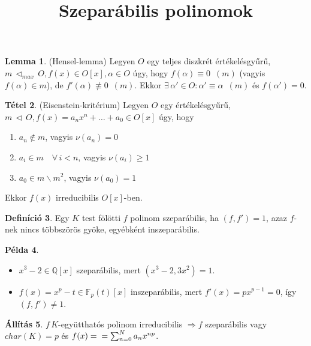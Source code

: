 \documentclass{article}
\title{Szeparábilis polinomok}
\author{}
\date{}
\theoremstyle{definition}
\newtheorem{tetel}{Tétel}[section]
\newtheorem{lemma}[tetel]{Lemma}
\newtheorem{all}[tetel]{Állítás}
\newtheorem{defi}[tetel]{Definíció}
\newtheorem{pl}[tetel]{Példa}
\begin{document}
\maketitle
\vspace{-1.5cm}

\begin{lemma}
    (Hensel-lemma) Legyen $O$ egy teljes diszkrét értékelésgyűrű, $m \, \triangleleft  _{max} \, O, f(x) \in O[x], \alpha \in O$ úgy, hogy $f(\alpha) \equiv 0 \, \, \, (m)$ (vagyis $f(\alpha) \in m$), de $f '(\alpha) \not\equiv 0 \, \, \, (m)$. Ekkor $\exists \, \alpha' \in O: \alpha' \equiv \alpha \, \, \, (m)$ és $f(\alpha') = 0$.
\end{lemma}

\begin{tetel}
    (Eisenstein-kritérium) Legyen $O$ egy értékelésgyűrű, $m \, \triangleleft \, O, f(x) = a_nx^n + \dots + a_0 \in O[x]$ úgy, hogy
    \begin{enumerate}
        \item $a_n \notin m$, vagyis $\nu(a_n) = 0$
        \item $a_i \in m \quad \forall \, i < n$, vagyis $\nu(a_i) \ge 1$
        \item $a_0 \in m \backslash m^2$, vagyis $\nu(a_0) = 1$
    \end{enumerate}
    Ekkor $f(x)$ irreducibilis $O[x]$-ben.
\end{tetel}

\begin{defi}
    Egy $K$ test fölötti $f$ polinom szeparábilis, ha $(f, f') = 1$, azaz $f$-nek nincs többszörös gyöke, egyébként inszeparábilis.
\end{defi}

\begin{pl}
    \mbox{}
    \begin{itemize}
        \item $x^3 - 2 \in \mathbb{Q}[x]$ szeparábilis, mert $(x^3 - 2, 3x^2) = 1$.
        \item $f(x) = x^p - t \in \mathbb{F}_p(t)[x]$ inszeparábilis, mert $f'(x) = px^{p-1} = 0$, így $(f, f') \ne 1$.
    \end{itemize}
\end{pl}

\begin{all}
    $f \, K$-együtthatós polinom irreducibilis $\Rightarrow f$ szeparábilis vagy $char(K) = p$ és $f(x) = \\ = \sum_{n=0}^{N} a_nx^{np}$.
\end{all}
\end{document}
